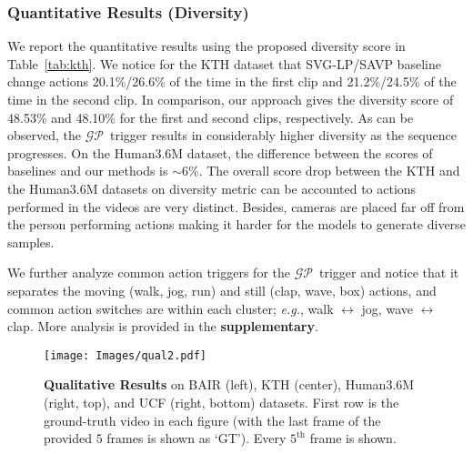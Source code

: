 \documentclass{article} \usepackage{iclr2021_conference,times}
\newcommand{\GP}{$\mathcal{GP}$}
\def\eg{\emph{e.g.}}
\begin{document}
\vspace{-0.05in}
\subsubsection{Quantitative Results (Diversity)}
\vspace{-0.05in}
We report the quantitative results using the proposed diversity score in Table~\ref{tab:kth}. We notice for the KTH dataset that SVG-LP/SAVP baseline change actions 20.1\%/26.6\% of the time in the first clip and 21.2\%/24.5\% of the time in the second clip.  In comparison, our approach gives the diversity score of 48.53\% and 48.10\% for the first and second clips, respectively. As can be observed, the \GP\ trigger results in considerably higher diversity as the sequence progresses. On the Human3.6M dataset, the difference between the scores of baselines and our methods is $\sim$6\%. The overall score drop between the KTH and the Human3.6M datasets on diversity metric can be accounted to actions performed in the videos are very distinct. Besides, cameras are placed far off from the person performing actions making it harder for the models to generate diverse samples.

We further analyze common action triggers for the \GP\ trigger and notice that it separates the moving (walk, jog, run) and still (clap, wave, box) actions, and common action switches are within each cluster; \eg, walk $\leftrightarrow$ jog, wave $\leftrightarrow$ clap. More analysis is provided in the \textbf{supplementary}.
\begin{figure}
    \centering

    \texttt{[image: Images/qual2.pdf]}

    \caption{\textbf{Qualitative Results} on BAIR (left), KTH (center), Human3.6M (right, top), and UCF (right, bottom) datasets. First row is the ground-truth video in each figure (with the last frame of the provided $5$ frames is shown as `GT'). Every $5^\text{th}$ frame is shown.}
    \label{fig:qualitative}
\end{figure}

\vspace{-0.05in}
\end{document}
